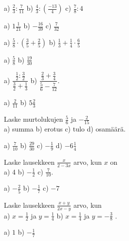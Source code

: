 \begin{tehtava}
a) $\frac{2}{3} : \frac{7}{11}$ \qquad b) $\frac{4}{3}:(\frac{-13}{4})$ \qquad c) $\frac{7}{8}:4$
\begin{vastaus}
a) $1\frac{1}{21}$ \qquad b) $-\frac{16}{39}$ \qquad c) $\frac{7}{32}$
\end{vastaus}
\end{tehtava}

\begin{tehtava}
a) $\frac{5}{8}\cdot(\frac{3}{5}+\frac{2}{5})$ \qquad b) $\frac{1}{3}+\frac{1}{4}\cdot\frac{6}{5}$
\begin{vastaus}
a) $\frac{5}{8}$ \qquad b) $\frac{19}{30}$
\end{vastaus}
\end{tehtava}

\begin{tehtava}
a) $\dfrac{\frac{1}{2}:\frac{3}{2}}{\frac{3}{2}+\frac{1}{3}}$ \qquad b) $\dfrac{\frac{2}{3}+\frac{3}{4}}{\frac{5}{6}-\frac{7}{12}}$.
\begin{vastaus}
a) $\frac{2}{11}$ \qquad b) $5\frac{2}{3}$
\end{vastaus}
\end{tehtava}

\begin{tehtava}
Laske murtolukujen $\frac{5}{6}$ ja $-\frac{2}{15}$ \\ a) summa \qquad b) erotus \qquad c) tulo \qquad d) osamäärä.
\begin{vastaus}
a) $\frac{7}{10}$ \qquad b) $\frac{29}{30}$ \qquad c) $-\frac{1}{9}$ \qquad d) $-6\frac{1}{4}$
\end{vastaus}
\end{tehtava}

\begin{tehtava}
Laske lausekkeen $\frac{x}{2-3x}$ arvo, kun $x$ on \\ a) 4 \qquad b) $-\frac{1}{2}$ \qquad c) $\frac{7}{10}$.
\begin{vastaus}
a) $-\frac{2}{5}$ \qquad b) $-\frac{1}{7}$ \qquad c) $-7$
\end{vastaus}
\end{tehtava}

\begin{tehtava}
Laske lausekkeen $\frac{x+y}{2x-y}$ arvo, kun \\ a) $x=\frac{1}{2}$ ja $y= \frac{1}{4}$ \qquad b) $x=\frac{1}{4}$ ja $y= -\frac{3}{8}$ \qquad.
\begin{vastaus}
a) $1$ \qquad b) $-\frac{1}{7}$
\end{vastaus}
\end{tehtava}

